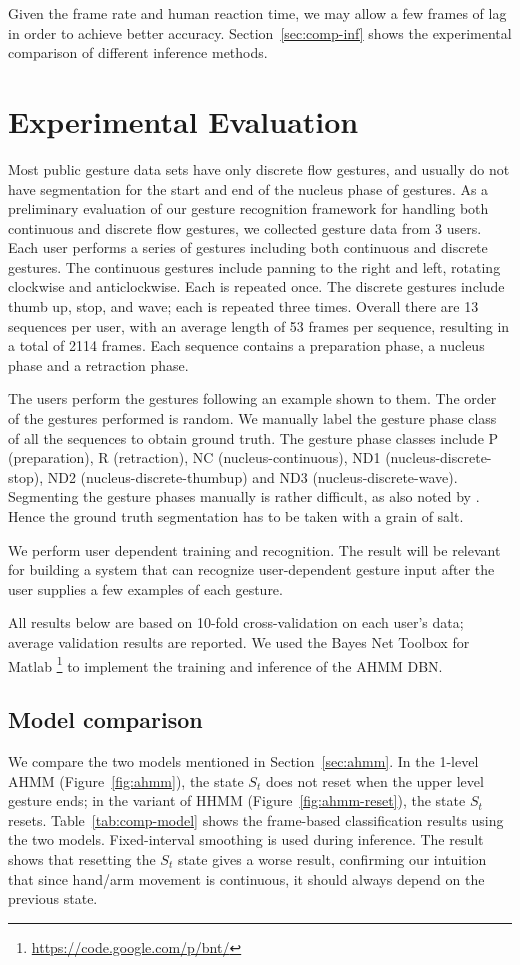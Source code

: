 \documentclass[10pt,twocolumn,letterpaper]{article}
\begin{document}
Given the frame rate and human reaction time, we may allow a few frames of lag in order
to achieve better accuracy. Section~\ref{sec:comp-inf} shows the experimental comparison of different
inference methods.

\section{Experimental Evaluation}\label{sec:eval}
Most public gesture data sets have only discrete flow gestures, and usually do not have
segmentation for the start and end of the nucleus phase of gestures. As a preliminary evaluation
of our gesture recognition framework for handling both continuous and discrete flow gestures, 
we collected gesture data from 3 users. Each user performs a series of gestures 
including both continuous and discrete gestures. The continuous gestures include
panning to the right and left, rotating clockwise and anticlockwise. Each is repeated once. 
The discrete gestures include thumb up, stop, and wave; each is repeated three times. 
Overall there are 13 sequences per user, with an average length of 53 frames per
sequence, resulting in a total of 2114 frames. Each sequence contains a preparation phase, a nucleus phase and a retraction
phase.

The users perform the gestures following an example shown to them. The order of the gestures performed is random. 
We manually label the gesture phase class of all the sequences to obtain ground truth.
The gesture phase classes include P (preparation), R (retraction), NC (nucleus-continuous),
ND1 (nucleus-discrete-stop), ND2 (nucleus-discrete-thumbup) and ND3 (nucleus-discrete-wave). Segmenting the gesture
phases manually is rather difficult, as also noted by \cite{francoise10}. Hence
the ground truth segmentation has to be taken with a grain of salt.  

We perform user
dependent training and recognition. The result will be relevant for building a system that can
recognize user-dependent gesture input after the user supplies a few examples of 
each gesture.

All results below are based on 10-fold cross-validation on each user's data; average validation results
are reported. We used the Bayes Net Toolbox for Matlab \footnote{\url{https://code.google.com/p/bnt/}} to implement the training
and inference of the AHMM DBN.

\subsection{Model comparison}\label{sec:exp-model}
We compare the two models mentioned in Section~\ref{sec:ahmm}. In the 1-level AHMM (Figure~\ref{fig:ahmm}), the state $S_t$ does not reset when
the upper level gesture ends; in the
variant of HHMM (Figure~\ref{fig:ahmm-reset}), the state $S_t$ resets. Table~\ref{tab:comp-model} shows the frame-based classification
results using the two models. Fixed-interval smoothing is used during inference.
The result shows that resetting the $S_t$ state gives a worse result, confirming our 
intuition that since hand/arm movement is continuous, it should always depend on
the previous state. 
\end{document}
